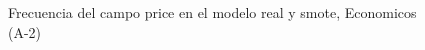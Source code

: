 \begin{figure}[H]
    \centering
    
    \caption{Frecuencia del campo  price en el modelo real y smote, Economicos (A-2)}
    \label{frecuency- Price-smote-enc}
\end{figure}